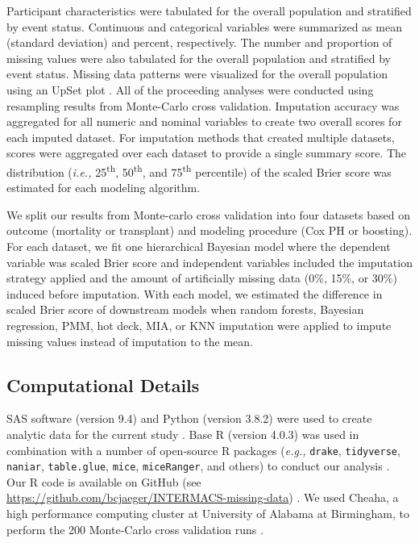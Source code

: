 \documentclass{article}
\begin{document}
Participant characteristics were tabulated for the overall population
and stratified by event status. Continuous and categorical variables
were summarized as mean (standard deviation) and percent, respectively.
The number and proportion of missing values were also tabulated for the
overall population and stratified by event status. Missing data patterns
were visualized for the overall population using an UpSet plot
\cite{lex2014upset}. All of the proceeding analyses were conducted using
resampling results from Monte-Carlo cross validation. Imputation
accuracy was aggregated for all numeric and nominal variables to create
two overall scores for each imputed dataset. For imputation methods that
created multiple datasets, scores were aggregated over each dataset to
provide a single summary score. The distribution
(\textit{i.e., }25\textsuperscript{th}, 50\textsuperscript{th}, and
75\textsuperscript{th} percentile) of the scaled Brier score was
estimated for each modeling algorithm.

We split our results from Monte-carlo cross validation into four
datasets based on outcome (mortality or transplant) and modeling
procedure (Cox PH or boosting). For each dataset, we fit one
hierarchical Bayesian model where the dependent variable was scaled
Brier score and independent variables included the imputation strategy
applied and the amount of artificially missing data (0\%, 15\%, or 30\%)
induced before imputation. With each model, we estimated the difference
in scaled Brier score of downstream models when random forests, Bayesian
regression, PMM, hot deck, MIA, or KNN imputation were applied to impute
missing values instead of imputation to the mean.

\hypertarget{computational-details}{%
\subsection{Computational Details}\label{computational-details}}

\label{subsec:computing}

SAS software (version 9.4) and Python (version 3.8.2) were used to
create analytic data for the current study
\cite{van1995python, sas2013}. Base R (version 4.0.3) was used in
combination with a number of open-source R packages
(\textit{e.g., }\texttt{drake}, \texttt{tidyverse}, \texttt{naniar},
\texttt{table.glue}, \texttt{mice}, \texttt{miceRanger}, and others) to
conduct our analysis
\cite{drake, naniar, mice, miceRanger, table.glue, tidyverse, rstanarm, tidybayes, survival, tidymodels, riskRegression}.
Our R code is available on GitHub (see
\url{https://github.com/bcjaeger/INTERMACS-missing-data})
\cite{byron_2020_4247449}. We used Cheaha, a high performance computing
cluster at University of Alabama at Birmingham, to perform the 200
Monte-Carlo cross validation runs \cite{cheaha}.
\end{document}
